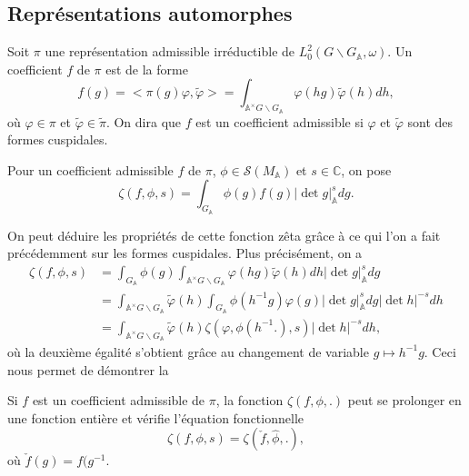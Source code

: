 \subsection{Représentations automorphes}

Soit $\pi$ une représentation admissible irréductible de $L_0^2(G \backslash G_\mathbb{A}, \omega)$. Un coefficient $f$ de $\pi$ est de la forme
\begin{equation}
f(g) = <\pi(g)\varphi, \tilde{\varphi}> = \int_{\mathbb{A}^\times G \backslash G_\mathbb{A}} \varphi(hg) \tilde{\varphi}(h) dh,
\end{equation}
où $\varphi \in \pi$ et $\tilde{\varphi} \in \tilde{\pi}$. On dira que $f$ est un coefficient admissible si $\varphi$ et $\tilde{\varphi}$ sont des formes cuspidales.

Pour un coefficient admissible $f$ de $\pi$, $\phi \in \mathcal{S}(M_\mathbb{A})$ et $s \in \mathbb{C}$, on pose
\begin{equation}
\zeta(f, \phi, s) = \int_{G_\mathbb{A}} \phi(g) f(g) |\det g|_\mathbb{A}^s dg.
\end{equation}

On peut déduire les propriétés de cette fonction zêta grâce à ce qui l'on a fait précédemment sur les formes cuspidales. Plus précisément, on a
\begin{align}
\zeta(f, \phi, s) &= \int_{G_\mathbb{A}}\phi(g)\int_{\mathbb{A}^\times G \backslash G_\mathbb{A}} \varphi(hg) \tilde{\varphi}(h) dh |\det g|_\mathbb{A}^s dg \\
&= \int_{\mathbb{A}^\times G \backslash G_\mathbb{A}} \tilde{\varphi}(h) \int_{G_\mathbb{A}}\phi(h^{-1}g)\varphi(g)|\det g|_\mathbb{A}^s dg |\det h|^{-s} dh \\
&= \int_{\mathbb{A}^\times G \backslash G_\mathbb{A}} \tilde{\varphi}(h) \zeta(\varphi, \phi(h^{-1}.), s)|\det h|^{-s} dh,
\end{align}
où la deuxième égalité s'obtient grâce au changement de variable $g \mapsto h^{-1}g$. Ceci nous permet de démontrer la
\begin{proposition}
Si $f$ est un coefficient admissible de $\pi$, la fonction $\zeta(f, \phi, .)$ peut se prolonger en une fonction entière et vérifie l'équation fonctionnelle
\begin{equation}
\zeta(f, \phi, s) = \zeta(\check{f}, \hat{\phi}, .),
\end{equation}
où $\check{f}(g) = f(g^{-1}$.
\end{proposition}

